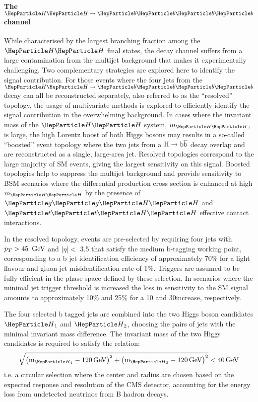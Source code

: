 \paragraph{The $\HH\to\bbbb$ channel}

While characterised by the largest branching fraction among the $\HH$ final states, the \bbbb decay channel suffers from a large contamination from the multijet background that makes it experimentally challenging.
Two complementary strategies are explored here to identify the signal contribution.
For those events where the four jets from the $\HH\to\bbbb$ decay can all be reconstructed separately, also referred to as the ``resolved'' topology, the usage of multivariate methods is explored to efficiently identify the signal contribution in the overwhelming background.
In cases where the invariant mass of the $\HH$ system, $m_{\HH}$, is large, the high Lorentz boost of both Higgs bosons may results in a so-called ``boosted'' event topology where the two jets from a $\text{H}\rightarrow\text{b}\overline{\text{b}}$ decay overlap and are reconstructed as a single, large-area jet.
Resolved topologies correspond to the large majority of SM \HH events, giving the largest sensitivity on this signal.
Boosted topologies help to suppress the multijet background and provide sensitivity to BSM scenarios where the differential \HH production cross section is enhanced at high $m_{\HH}$ by the presence of $\Pg\Pg\HH$ and $\PQt\PQt\HH$ effective contact interactions.

In the resolved topology, events are pre-selected by requiring four jets with $p_{T} > 45~\,\text{Ge\hspace{-.08em}V}$ and $|\eta| <$ 3.5 that satisfy the medium b-tagging working point, corresponding to a b jet identification efficiency of approximately 70\% for a light  flavour and gluon jet misidentification rate of  1\%.
Triggers are assumed to be fully efficient in the phase space defined by these selection.
In scenarios where the minimal jet trigger \pt threshold is increased the loss in sensitivity to the SM signal amounts to approximately 10\% and 25\% for a 10 and 30\GeV increase, respectively.

The four selected b tagged jets are combined into the two Higgs boson candidates $\PH_1$ and $\PH_2$, choosing the pairs of jets with the minimal invariant mass difference.
The invariant mass of the two Higgs candidates is required to satisfy the relation:
\begin{equation}
\sqrt{ \left( \text{m}_{\PH_1} - 120\GeV\right)^2 + \left( \text{m}_{\PH_2} - 120\GeV\right)^2 } < 40\GeV
\end{equation}
i.e. a circular selection where the center and radius are chosen based on the expected response and resolution of the CMS detector, accounting for the energy loss from undetected neutrinos from B hadron decays.

